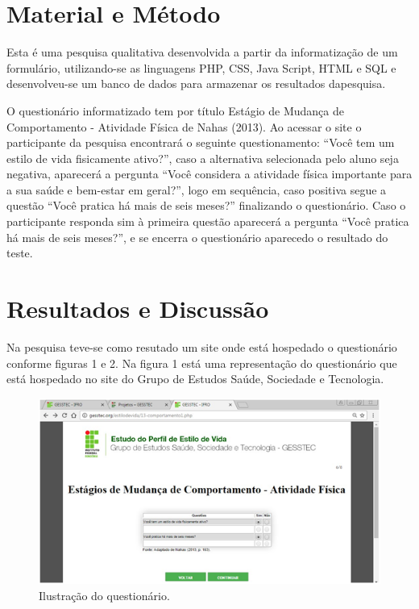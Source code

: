 \documentclass[article,12pt,onesidea,4paper,english,brazil]{abntex2}
\begin{document}
	\section*{Material e Método}
	
Esta é uma pesquisa qualitativa desenvolvida a partir da informatização de um formulário, utilizando-se as linguagens PHP, CSS, Java Script, HTML e SQL e desenvolveu-se um banco de dados para armazenar os resultados dapesquisa.

O questionário informatizado tem por título Estágio de Mudança de Comportamento - Atividade Física de Nahas (2013). Ao acessar o site o participante da pesquisa encontrará o seguinte questionamento: “Você tem um estilo de vida fisicamente ativo?”, caso a alternativa selecionada pelo aluno seja negativa, aparecerá a pergunta “Você considera a atividade física importante para a sua  saúde e bem-estar em geral?”, logo em sequência, caso positiva segue a questão “Você pratica há mais de seis meses?” finalizando o questionário. Caso o participante responda sim à primeira questão aparecerá a pergunta “Você pratica há mais de seis meses?”, e se encerra o questionário aparecedo o resultado do teste.
	
	\section*{Resultados e Discussão}
	
	Na pesquisa teve-se como resutado um site onde está hospedado o questionário conforme figuras 1 e 2. Na figura 1 está uma representação do questionário que está hospedado no site do Grupo de Estudos Saúde, Sociedade e Tecnologia.
	\begin{figure}[h]
		\centering
		\includegraphics[width=0.7\linewidth]{pip-pg75-01}
		\caption{Ilustração do questionário.}
		\label{fig:pip-pg75-01}
	\end{figure}
\end{document}
